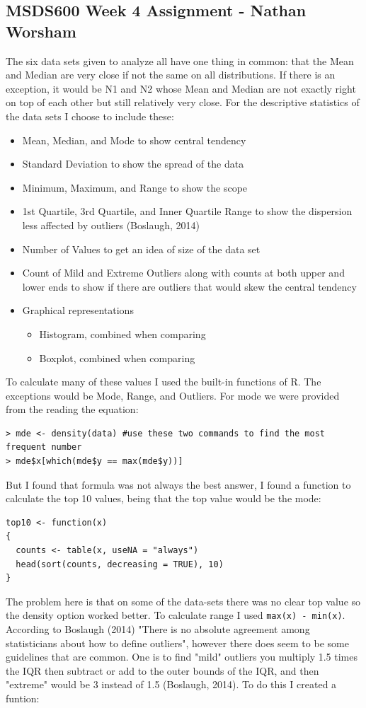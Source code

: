 \documentclass[10pt]{article}
\begin{document}
\subsection*{MSDS600 Week 4 Assignment - Nathan Worsham}
The six data sets given to analyze all have one thing in common: that the Mean and Median are very close if not the same on all distributions. If there is an exception, it would be N1 and N2 whose Mean and Median are not exactly right on top of each other but still relatively very close. For the descriptive statistics of the data sets I choose to include these:
\begin{itemize}
\item Mean, Median, and Mode to show central tendency
\item Standard Deviation to show the spread of the data
\item Minimum, Maximum, and Range to show the scope
\item 1st Quartile, 3rd Quartile, and Inner Quartile Range to show the dispersion less affected by outliers (Boslaugh, 2014)
\item Number of Values to get an idea of size of the data set
\item Count of Mild and Extreme Outliers along with counts at both upper and lower ends to show if there are outliers that would skew the central tendency 
\item Graphical representations\begin{itemize}
	\item Histogram, combined when comparing
	\item Boxplot, combined when comparing
\end{itemize}
\end{itemize}
To calculate many of these values I used the built-in functions of R. The exceptions would be Mode, Range, and Outliers. For mode we were provided from the reading the equation: 
\begin{verbatim}
> mde <- density(data) #use these two commands to find the most frequent number 
> mde$x[which(mde$y == max(mde$y))]
\end{verbatim}
But I found that formula was not always the best answer, I found a function to calculate the top 10 values, being that the top value would be the mode:
\begin{verbatim}
top10 <- function(x)
{
  counts <- table(x, useNA = "always")
  head(sort(counts, decreasing = TRUE), 10)
}
\end{verbatim}
The problem here is that on some of the data-sets there was no clear top value so the density option worked better. To calculate range I used \verb|max(x) - min(x)|. According to Boslaugh (2014) "There is no absolute agreement among statisticians about how to define outliers", however there does seem to be some guidelines that are common. One is to find "mild" outliers you multiply 1.5 times the IQR then subtract or add to the outer bounds of the IQR, and then "extreme" would be 3 instead of 1.5 (Boslaugh, 2014). To do this I created a funtion:
\end{document}
